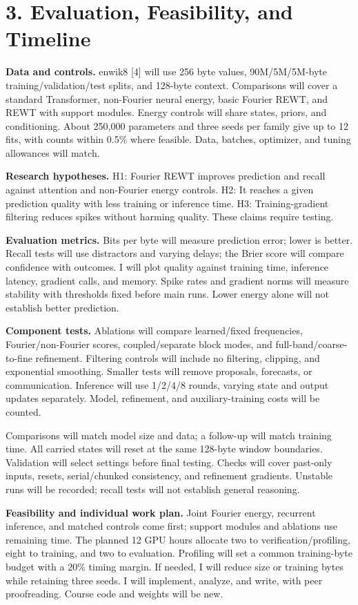 \documentclass[11pt,letterpaper]{article}
\begin{document}
\newpage
\section*{3. Evaluation, Feasibility, and Timeline}

\textbf{Data and controls.} enwik8 [4] will use 256 byte values, 90M/5M/5M-byte training/validation/test splits, and 128-byte context. Comparisons will cover a standard Transformer, non-Fourier neural energy, basic Fourier REWT, and REWT with support modules. Energy controls will share states, priors, and conditioning. About 250,000 parameters and three seeds per family give up to 12 fits, with counts within 0.5\% where feasible. Data, batches, optimizer, and tuning allowances will match.

\textbf{Research hypotheses.} H1: Fourier REWT improves prediction and recall against attention and non-Fourier energy controls. H2: It reaches a given prediction quality with less training or inference time. H3: Training-gradient filtering reduces spikes without harming quality. These claims require testing.

\textbf{Evaluation metrics.} Bits per byte will measure prediction error; lower is better. Recall tests will use distractors and varying delays; the Brier score will compare confidence with outcomes. I will plot quality against training time, inference latency, gradient calls, and memory. Spike rates and gradient norms will measure stability with thresholds fixed before main runs. Lower energy alone will not establish better prediction.

\textbf{Component tests.} Ablations will compare learned/fixed frequencies, Fourier/non-Fourier scores, coupled/separate block modes, and full-band/coarse-to-fine refinement. Filtering controls will include no filtering, clipping, and exponential smoothing. Smaller tests will remove proposals, forecasts, or communication. Inference will use 1/2/4/8 rounds, varying state and output updates separately. Model, refinement, and auxiliary-training costs will be counted.

Comparisons will match model size and data; a follow-up will match training time. All carried states will reset at the same 128-byte window boundaries. Validation will select settings before final testing. Checks will cover past-only inputs, resets, serial/chunked consistency, and refinement gradients. Unstable runs will be recorded; recall tests will not establish general reasoning.

\textbf{Feasibility and individual work plan.} Joint Fourier energy, recurrent inference, and matched controls come first; support modules and ablations use remaining time. The planned 12 GPU hours allocate two to verification/profiling, eight to training, and two to evaluation. Profiling will set a common training-byte budget with a 20\% timing margin. If needed, I will reduce size or training bytes while retaining three seeds. I will implement, analyze, and write, with peer proofreading. Course code and weights will be new.
\end{document}
